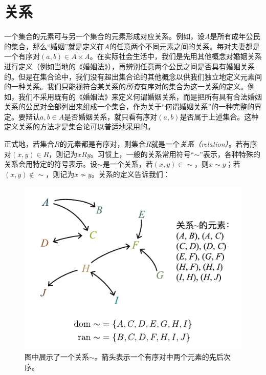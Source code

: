 \documentclass[../main.tex]{subfiles}
\begin{document}
\section{关系}
一个集合的元素可与另一个集合的元素形成对应关系。例如，设$A$是所有成年公民的集合，那么“婚姻”就是定义在$A$的任意两个不同元素之间的关系。每对夫妻都是一个有序对$\left(a,b\right)\in A\times A$。在实际社会生活中，我们是先用其他概念对婚姻关系进行定义（例如当地的《婚姻法》），再辨别任意两个公民之间是否具有婚姻关系的。但是在集合论中，我们没有超出集合论的其他概念以供我们独立地定义元素间的一种关系。我们只能视符合某关系的\emph{所有}有序对的集合为这一关系的定义。例如，我们不采用既有的《婚姻法》来定义何谓婚姻关系，而是把所有具有合法婚姻关系的公民对全部列出来组成一个集合，作为关于“何谓婚姻关系”的一种完整的界定。要辩认$a, b\in A$是否婚姻关系，就只看有序对$\left(a,b\right)$是否属于上述集合。这种定义关系的方法才是集合论可以普适地采用的。

正式地，若集合$R$的元素都是有序对，则集合$R$就是一个\emph{关系（relation）}。若有序对$\left(x,y\right)\in R$，则记为$xRy$。习惯上，一般的关系常用符号“$\sim$”表示，各种特殊的关系会用特定的符号表示。设$\sim$是一个关系，若$\left(x,y\right)\in \sim$，则$x\sim y$；若$\left(x,y\right)\notin\sim$，则记为$x\not\sim y$。关系的定义告诉我们：

\begin{figure}[htbp]
    \centering
    \includegraphics{../images/relation.pdf}
    \caption{图中展示了一个关系$\sim$。箭头表示一个有序对中两个元素的先后次序。}
    \label{fig:II.1.1}
\end{figure}
\end{document}
